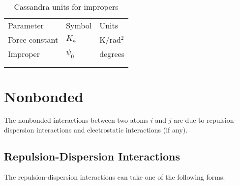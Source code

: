 \begin{center}
\begin{table}[h]
	\begin{center}
	\caption{Cassandra units for impropers}
	\begin{tabular} {l l l} \\ \hline \hline
	 Parameter      & Symbol   &  Units \\
	 Force constant & $K_\psi$ &  K/rad$^2$\\
	 Improper	& $\psi_0$ & degrees \\ \\ \hline \\
	
	\end{tabular}
	\end{center}
	\label{Tab:Improper_Units}
\end{table}
\end{center}

\section{Nonbonded}\label{Sec:NB}
The nonbonded interactions between two atoms $i$ and $j$ are due to repulsion-dispersion interactions and electrostatic interactions (if any). 
\subsection{Repulsion-Dispersion Interactions} \label{Sec:LJ}
The repulsion-dispersion interactions can take one of the following forms:

